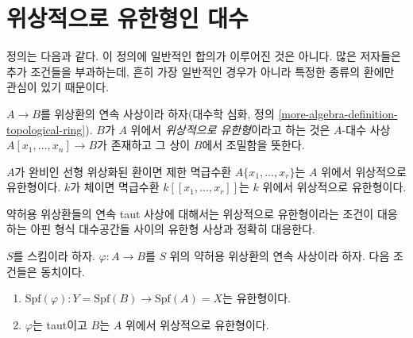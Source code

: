 \section{위상적으로 유한형인 대수}
\label{section-tft}

\noindent
정의는 다음과 같다. 이 정의에 일반적인 합의가 이루어진 것은 아니다.
많은 저자들은 추가 조건들을 부과하는데, 흔히 가장 일반적인 경우가 아니라
특정한 종류의 환에만 관심이 있기 때문이다.

\begin{definition}
\label{definition-topologically-finite-type}
$A \to B$를 위상환의 연속 사상이라 하자(대수학 심화, 정의
\ref{more-algebra-definition-topological-ring}). $B$가 $A$ 위에서
{\it 위상적으로 유한형}이라고 하는 것은 $A$-대수 사상
$A[x_1, \ldots, x_n] \to B$가 존재하고 그 상이 $B$에서 조밀함을 뜻한다.
\end{definition}

\noindent
$A$가 완비인 선형 위상화된 환이면 제한 멱급수환
$A\{x_1, \ldots, x_r\}$는 $A$ 위에서 위상적으로 유한형이다.
$k$가 체이면 멱급수환 $k[[x_1, \ldots, x_r]]$는 $k$ 위에서
위상적으로 유한형이다.

\medskip\noindent
약허용 위상환들의 연속 taut 사상에 대해서는 위상적으로 유한형이라는
조건이 대응하는 아핀 형식 대수공간들 사이의 유한형 사상과 정확히 대응한다.

\begin{lemma}
\label{lemma-topologically-finite-type-finite-type}
$S$를 스킴이라 하자. $\varphi : A \to B$를 $S$ 위의 약허용 위상환의
연속 사상이라 하자. 다음 조건들은 동치이다.
\begin{enumerate}
\item $\text{Spf}(\varphi) : Y = \text{Spf}(B) \to \text{Spf}(A) = X$는
유한형이다.
\item $\varphi$는 taut이고 $B$는 $A$ 위에서 위상적으로 유한형이다.
\end{enumerate}
\end{lemma}

